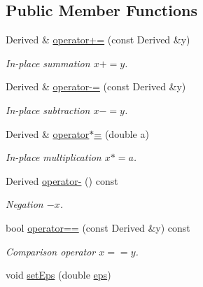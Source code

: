 \subsection*{Public Member Functions}
\begin{DoxyCompactItemize}
\item 
Derived \& \hyperlink{classSpacy_1_1SupportedOperatorBase_a9d52829c0e1fcafab1f2a3de17379633_a9d52829c0e1fcafab1f2a3de17379633}{operator+=} (const Derived \&y)
\begin{DoxyCompactList}\small\item\em In-\/place summation $ x+=y$. \end{DoxyCompactList}\item 
Derived \& \hyperlink{classSpacy_1_1SupportedOperatorBase_af21496412c35e4afa59779b4fe1b67d5_af21496412c35e4afa59779b4fe1b67d5}{operator-\/=} (const Derived \&y)
\begin{DoxyCompactList}\small\item\em In-\/place subtraction $ x-=y$. \end{DoxyCompactList}\item 
Derived \& \hyperlink{classSpacy_1_1SupportedOperatorBase_a15adabb20b53d84a79982b0668a67f68_a15adabb20b53d84a79982b0668a67f68}{operator$\ast$=} (double a)
\begin{DoxyCompactList}\small\item\em In-\/place multiplication $ x*=a$. \end{DoxyCompactList}\item 
Derived \hyperlink{classSpacy_1_1SupportedOperatorBase_a0adcaddc24efbbdccbd891df99971c6c_a0adcaddc24efbbdccbd891df99971c6c}{operator-\/} () const 
\begin{DoxyCompactList}\small\item\em Negation $ -x$. \end{DoxyCompactList}\item 
bool \hyperlink{classSpacy_1_1SupportedOperatorBase_aa493a6ea82feb3480a1c83395a0a7c3a_aa493a6ea82feb3480a1c83395a0a7c3a}{operator==} (const Derived \&y) const 
\begin{DoxyCompactList}\small\item\em Comparison operator $ x==y$. \end{DoxyCompactList}\item 
void \hyperlink{classSpacy_1_1Mixin_1_1Eps_a1bbfd62541610d5d80f2782ab77158e4_a1bbfd62541610d5d80f2782ab77158e4}{set\+Eps} (double \hyperlink{classSpacy_1_1Mixin_1_1Eps_a40e2ba8f3abd2b5370ef41238cfaaf8b_a40e2ba8f3abd2b5370ef41238cfaaf8b}{eps})

\end{DoxyCompactItemize}
